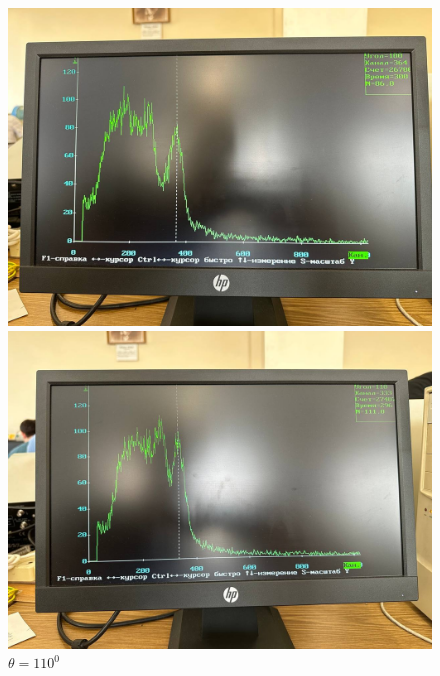 \documentclass[a4paper, 12pt]{article}
\begin{document}
    \begin{figure}[H]
    \begin{minipage}[h]{0.3\linewidth}
        \includegraphics[width = 1\linewidth]{res/011.jpg}
        \caption{$\theta = 100^0$}
    \end{minipage}
    \hfill
    \begin{minipage}[h]{0.3\linewidth}
        \includegraphics[width = 1\linewidth]{res/012.jpg}
        \caption{$\theta = 110^0$}
    \end{minipage}
    \hfill
    \begin{minipage}[h]{0.3\linewidth}

\end{minipage}
\end{figure}
\end{document}
